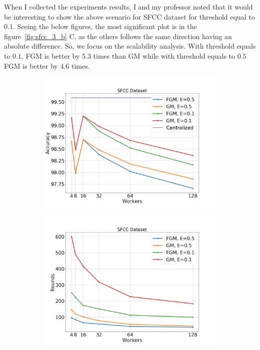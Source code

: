 When I collected the experiments results, I and my professor noted that it would be interesting to show the above scenario for SFCC dataset for threshold equal to $0.1$.
Seeing the below figures, the most significant plot is in the figure~\ref{fig:sfcc_3_b} C, as the others follows the same direction having an absolute difference.
So, we focus on the scalability analysis.
With threshold equals to $0.1$, FGM is better by $5.3$ times than GM while with threshold equals to $0.5$ FGM is better by $4.6$ times.

\begin{figure}[H]
    \centering
    \begin{subfigure}[b]{0.48\textwidth}
        \includegraphics[width=\textwidth]{./images/results/sfc-plots/exp_Fig_3_1_b.png}
        \caption{}
    \end{subfigure}
    \begin{subfigure}[b]{0.48\textwidth}
        \includegraphics[width=\textwidth]{./images/results/sfc-plots/exp_Fig_3_2_b.png}

\end{subfigure}
\end{figure}
